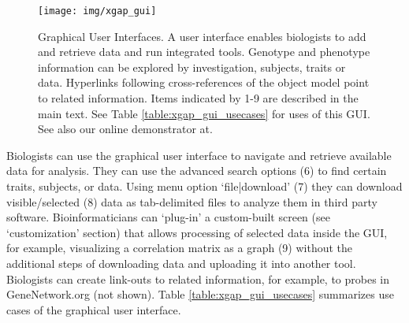\begin{figure}
	\texttt{[image: img/xgap\_gui]}
	\caption[Graphical User Interfaces]{Graphical User Interfaces. A user interface enables biologists to add and retrieve data and run integrated tools. Genotype and phenotype information can be explored by investigation, subjects, traits or data. Hyperlinks following cross-references of the object model point to related information. Items indicated by 1-9 are described in the main text. See Table \ref{table:xgap_gui_usecases} for uses of this GUI. See also our online demonstrator at\cite{xgap_url}.}
	\label{fig:xgap_gui}
\end{figure}

Biologists can use the graphical user interface to navigate and retrieve available data for analysis.
They can use the advanced search options (6) to find certain traits, subjects, or data.
Using menu option ‘file|download’ (7) they can download visible/selected (8) data as tab-delimited files to analyze them in third party software.
Bioinformaticians can ‘plug-in’ a custom-built screen (see ‘customization’ section) that allows processing of selected data inside the GUI, for example, visualizing a correlation matrix as a graph (9) without the additional steps of downloading data and uploading it into another tool.
Biologists can create link-outs to related information, for example, to probes in GeneNetwork.org (not shown).
Table \ref{table:xgap_gui_usecases} summarizes use cases of the graphical user interface.

